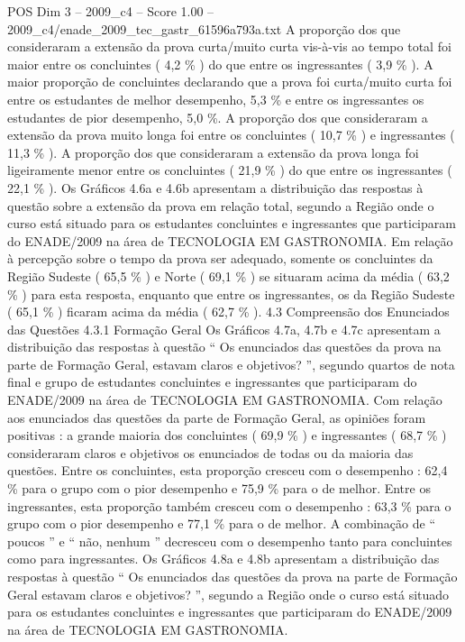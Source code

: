 \begin{textsample}{POS Dim 3 – 2009\_c4 – Score 1.00 – 2009\_c4/enade\_2009\_tec\_gastr\_61596a793a.txt}
A proporção dos que consideraram a extensão da prova curta/muito curta vis-à-vis ao tempo total foi maior entre os concluintes ( 4,2 \% ) do que entre os ingressantes ( 3,9 \% ).
A maior proporção de concluintes declarando que a prova foi curta/muito curta foi entre os estudantes de melhor desempenho, 5,3 \% e entre os ingressantes os estudantes de pior desempenho, 5,0 \%.
A proporção dos que consideraram a extensão da prova muito longa foi entre os concluintes ( 10,7 \% ) e ingressantes ( 11,3 \% ).
A proporção dos que consideraram a extensão da prova longa foi ligeiramente menor entre os concluintes ( 21,9 \% ) do que entre os ingressantes ( 22,1 \% ).
Os Gráficos 4.6a e 4.6b apresentam a distribuição das respostas à questão sobre a extensão da prova em relação total, segundo a Região onde o curso está situado para os estudantes concluintes e ingressantes que participaram do ENADE/2009 na área de TECNOLOGIA EM GASTRONOMIA.
Em relação à percepção sobre o tempo da prova ser adequado, somente os concluintes da Região Sudeste ( 65,5 \% ) e Norte ( 69,1 \% ) se situaram acima da média ( 63,2 \% ) para esta resposta, enquanto que entre os ingressantes, os da Região Sudeste ( 65,1 \% ) ficaram acima da média ( 62,7 \% ). 4.3 Compreensão dos Enunciados das Questões 4.3.1 Formação Geral Os Gráficos 4.7a, 4.7b e 4.7c apresentam a distribuição das respostas à questão “ Os enunciados das questões da prova na parte de Formação Geral, estavam claros e objetivos? ”, segundo quartos de nota final e grupo de estudantes concluintes e ingressantes que participaram do ENADE/2009 na área de TECNOLOGIA EM GASTRONOMIA.
Com relação aos enunciados das questões da parte de Formação Geral, as opiniões foram positivas : a grande maioria dos concluintes ( 69,9 \% ) e ingressantes ( 68,7 \% ) consideraram claros e objetivos os enunciados de todas ou da maioria das questões.
Entre os concluintes, esta proporção cresceu com o desempenho : 62,4 \% para o grupo com o pior desempenho e 75,9 \% para o de melhor.
Entre os ingressantes, esta proporção também cresceu com o desempenho : 63,3 \% para o grupo com o pior desempenho e 77,1 \% para o de melhor.
A combinação de “ poucos ” e “ não, nenhum ” decresceu com o desempenho tanto para concluintes como para ingressantes.
Os Gráficos 4.8a e 4.8b apresentam a distribuição das respostas à questão “ Os enunciados das questões da prova na parte de Formação Geral estavam claros e objetivos? ”, segundo a Região onde o curso está situado para os estudantes concluintes e ingressantes que participaram do ENADE/2009 na área de TECNOLOGIA EM GASTRONOMIA.

\end{textsample}

